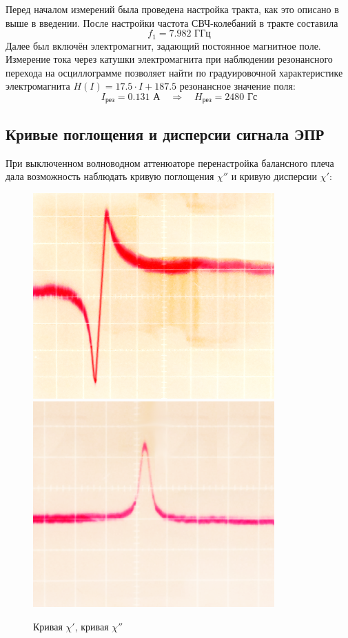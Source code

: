 \documentclass[a4paper,14pt]{extarticle}
\begin{document}
Перед началом измерений была проведена настройка тракта, как это описано в выше в введении. После настройки частота СВЧ-колебаний в тракте составила
\begin{equation}
  f_1=7.982 \text{ ГГц}
\end{equation}
Далее был включён электромагнит, задающий постоянное магнитное поле. Измерение тока через катушки электромагнита при наблюдении резонансного перехода на осциллограмме позволяет найти по градуировочной характеристике электромагнита $H(I)=17.5\cdot I+ 187.5$ резонансное значение поля:
\begin{equation}
  I_\text{рез}=0.131 \text{ А}  \quad\Rightarrow\quad
  H_\text{рез}=2480 \text{ Гс}
\end{equation}

\subsection{Кривые поглощения и дисперсии сигнала ЭПР}
При выключенном волноводном аттенюаторе перенастройка балансного плеча дала возможность наблюдать кривую поглощения $\chi''$ и кривую дисперсии $\chi'$:

\begin{figure}[h!]
    \centering
    \includegraphics[width=0.49\linewidth]{fig/xi_s.png}
    \includegraphics[width=0.49\linewidth]{fig/xi_ss.png}
    \caption{Кривая $\chi'$, кривая $\chi''$}
    \label{fig:2}
\end{figure}
\end{document}
